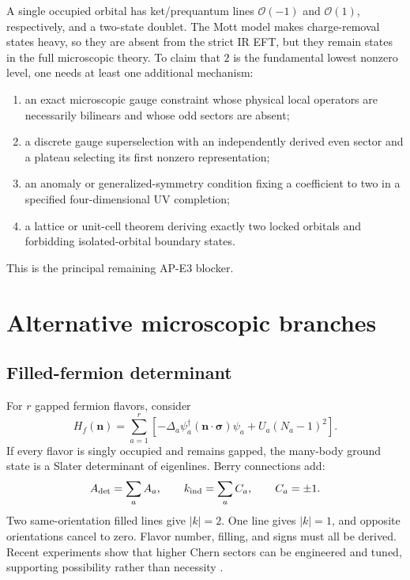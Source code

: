 \documentclass[11pt]{article}
\theoremstyle{definition}
\theoremstyle{remark}
\newcommand{\cO}{\mathcal O}
\begin{document}
A single occupied orbital has ket/prequantum lines \(\cO(-1)\) and
\(\cO(1)\), respectively, and a two-state doublet.  The
Mott model makes charge-removal states heavy, so they are absent from the
strict IR EFT, but they remain states in the full microscopic theory.  To
claim that \(2\) is the fundamental lowest nonzero level, one needs at least
one additional mechanism:
\begin{enumerate}
\item an exact microscopic gauge constraint whose physical local operators
  are necessarily bilinears and whose odd sectors are absent;
\item a discrete gauge superselection with an independently derived even
  sector and a plateau selecting its first nonzero representation;
\item an anomaly or generalized-symmetry condition fixing a coefficient to
  two in a specified four-dimensional UV completion;
\item a lattice or unit-cell theorem deriving exactly two locked orbitals and
  forbidding isolated-orbital boundary states.
\end{enumerate}
This is the principal remaining AP-E3 blocker.

\section{Alternative microscopic branches}

\subsection{Filled-fermion determinant}

For \(r\) gapped fermion flavors, consider
\begin{equation}
 H_f(\bm n)=\sum_{a=1}^r\left[
 -\Delta_a\psi_a^\dagger(\bm n\cdot\bm\sigma)\psi_a
 +U_a(N_a-1)^2\right].
\end{equation}
If every flavor is singly occupied and remains gapped, the many-body ground
state is a Slater determinant of eigenlines.  Berry connections add:
\begin{equation}
 A_{\det}=\sum_a A_a,\qquad
 k_{\rm ind}=\sum_a C_a,\qquad C_a=\pm1.
 \label{eq:fermion-sum}
\end{equation}
Two same-orientation filled lines give \(|k|=2\).  One line gives \(|k|=1\),
and opposite orientations cancel to zero.  Flavor number, filling, and signs must
all be derived.  Recent experiments show that higher Chern sectors can be
engineered and tuned, supporting possibility rather than necessity
\cite{LeeEtAl2023}.
\end{document}
